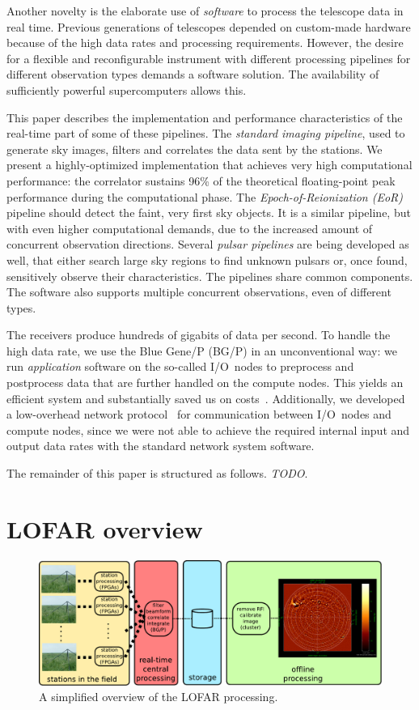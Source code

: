 \documentclass[10pt]{article}
\begin{document}
Another novelty is the elaborate use of \emph{software\/} to process
the telescope data in real time.
Previous generations of telescopes depended on custom-made hardware
because of the high data rates and processing requirements.
However, the desire for a flexible and reconfigurable instrument with
different processing pipelines for different observation types demands a
software solution.
The availability of sufficiently powerful supercomputers allows this.

This paper describes the implementation and performance characteristics of
the real-time part of some of these pipelines.
The \emph{standard imaging pipeline}, used to generate sky images,
filters and correlates the data sent by the stations.
We present a highly-optimized implementation that achieves very high
computational performance: the correlator sustains 96\% of the theoretical
floating-point peak performance during the computational phase.
The \emph{Epoch-of-Reionization (EoR)\/} pipeline should detect the faint,
very first sky objects.
It is a similar pipeline, but with even higher computational demands, due to
the increased amount of concurrent observation directions.
Several \emph{pulsar pipelines\/} are being developed as well, that either
search large sky regions to find unknown pulsars or, once found, sensitively
observe their characteristics.
The pipelines share common components.
The software also supports multiple concurrent observations, even of different
types.

The receivers produce hundreds of gigabits of data per second.
To handle the high data rate,
we use the Blue Gene/P (BG/P) in an unconventional way: we run
\emph{application\/} software on the so-called I/O~nodes to preprocess and
postprocess data that are further handled on the compute nodes.
This yields an efficient system and substantially saved us on
costs~\cite{Iskra:08}.
Additionally, we developed a low-overhead network protocol~\cite{Romein:09a}
for communication between I/O~nodes and compute nodes, since we were not able
to achieve the required internal input and output data rates with the standard
network system software.

The remainder of this paper is structured as follows.
\emph{TODO}.


\section{LOFAR overview}

\begin{figure}
\includegraphics[width=\textwidth]{lofar-overview.pdf}
\caption{A simplified overview of the LOFAR processing.}
\label{lofar-overview}
\end{figure}
\end{document}
